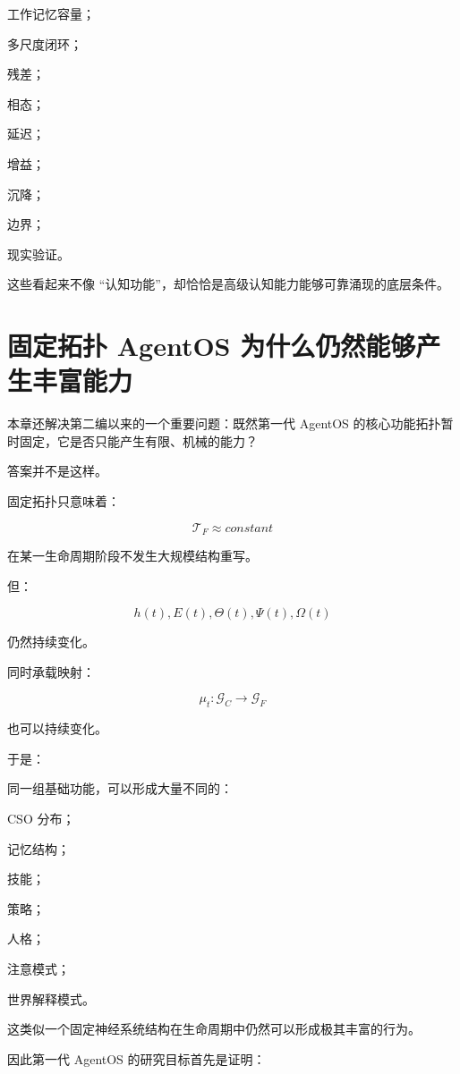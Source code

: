 工作记忆容量；

多尺度闭环；

残差；

相态；

延迟；

增益；

沉降；

边界；

现实验证。

这些看起来不像 ``认知功能''，却恰恰是高级认知能力能够可靠涌现的底层条件。

\section{固定拓扑 AgentOS 为什么仍然能够产生丰富能力}

本章还解决第二编以来的一个重要问题：既然第一代 AgentOS 的核心功能拓扑暂时固定，它是否只能产生有限、机械的能力？

答案并不是这样。

固定拓扑只意味着：

\[
\mathcal T_F
\approx
constant
\]

在某一生命周期阶段不发生大规模结构重写。

但：

\[
h(t),
E(t),
\Theta(t),
\Psi(t),
\Omega(t)
\]

仍然持续变化。

同时承载映射：

\[
\mu_t:
\mathcal G_C
\rightarrow
\mathcal G_F
\]

也可以持续变化。

于是：

\begin{statementbox}
\centering
{}
\end{statementbox}

同一组基础功能，可以形成大量不同的：

CSO 分布；

记忆结构；

技能；

策略；

人格；

注意模式；

世界解释模式。

这类似一个固定神经系统结构在生命周期中仍然可以形成极其丰富的行为。

因此第一代 AgentOS 的研究目标首先是证明：

